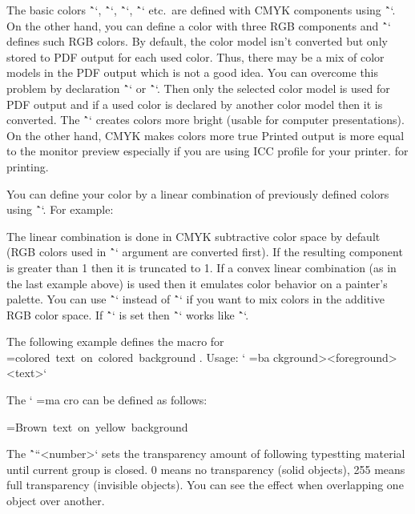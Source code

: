 {The basic colors \^`\Blue`, \^`\Red`, \^`\Cyan`, \^`\Yellow` etc.\ are defined
with CMYK components using \^`\setcmykcolor`.
On the other hand, you can define a color with three
RGB components and \^`\morecolors` defines such RGB colors.
By default, the color model isn't converted but only stored to
PDF output for each used color. Thus, there may be a mix of color
models in the PDF output which is not a good idea. You can overcome this
problem by declaration \^`\onlyrgb` or \^`\onlycmyk`. Then only the selected color
model is used for PDF output and if a used color is declared by another color
model then it is converted.
The \^`\onlyrgb` creates colors more bright (usable for computer
presentations). On the other hand, CMYK makes colors more true\fnote
{Printed output is more equal to the monitor preview especially if you are
using ICC profile for your printer.}
for printing.

You can define your color by a linear combination of previously defined colors using
\^``. For example:

\begtt
{} \myCyan {.3\Green + .5\Blue}  %
 \DarkBlue {\Blue + .4\Black}  %
 \myGreen{\Cyan+\Yellow}       %
{} \MyColor {.3\Orange+.5\Green+.2\Yellow}
\endtt
%
The linear combination is done in CMYK subtractive color space by default
(RGB colors used in \^`` argument are converted first).
If the resulting component is greater than 1 then it is truncated to 1.
If a convex linear combination (as in the last example above) is used then it
emulates color behavior on a painter's palette.
You can use \^`\rgbcolordef` instead of \^`` if you want to mix colors
in the additive RGB color space.
If \^`\onlyrgb` is set then \^`` works like \^`\rgbcolordef`.

\def\coloron#1#2#3{%
   \setbox0=\hbox{#2#3}\leavevmode
   \rlap{#1\strut \vrule width\wd0}
}
The following example defines the macro for
\coloron\Yellow\Brown{colored text on colored background}. Usage:
`\coloron<background><foreground>{<text>}`

The `\coloron` macro can be defined as follows:

\begtt
\def\coloron#1#2#3{%
   \setbox0=\hbox{#2#3}%
   \leavevmode \rlap{#1\strut \vrule width\wd0}
}
\coloron\Yellow\Brown{Brown text on yellow background}
\endtt

The \^`\transparency``<number>` sets the transparency amount of following
typestting material until current group is closed.
0 means no transparency (solid objects), 255 means
full transparency (invisible objects). You can see the effect when
overlapping one object over another.


}
